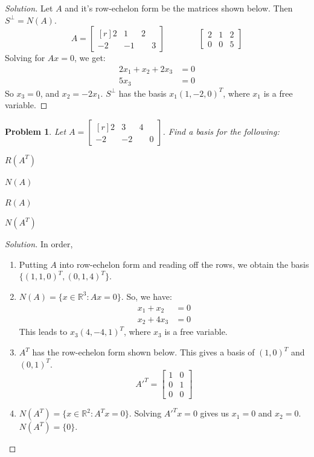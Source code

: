 \documentclass[oneside]{book}
\theoremstyle{mystyle}
\newtheorem{problem}{Problem}[section]
\begin{document}
\begin{proof}[Solution]
Let $A$ and it's row-echelon form be the matrices shown below. Then $S^{\perp} = N(A)$.
\begin{equation*}
    A=\begin{bmatrix*}[r] 2 & 1 & 2 \\ -2 & -1 & \phantom{-}3\end{bmatrix*}\quad\quad\quad\quad \begin{bmatrix} 2 & 1 & 2 \\ 0 & 0 & 5 \end{bmatrix}
\end{equation*}
Solving for $Ax = 0$, we get:
\begin{align*}
     2x_1 + x_2 + 2x_3 &= 0\\ 
     5x_3 &= 0    
\end{align*}
So $x_3 = 0$, and $x_2 = - 2x_1$. $S^{\perp}$ has the basis $x_1(1,-2,0)^T$, where $x_1$ is a free variable.
\end{proof}
\begin{problem}
Let $A = \begin{bmatrix*}[r] 2 & 3 & 4 \\ -2 & -2 & \phantom{-}0 \end{bmatrix*}$. Find a basis for the following:
\begin{enumerate}
\begin{multicols}{4}
    \item $R(A^T)$
    \item $N(A)$
    \item $R(A)$
    \item $N(A^T)$
\end{multicols}
\end{enumerate}
\end{problem}
\begin{proof}[Solution]
In order,
\begin{enumerate}[itemsep=0pt]
    \item Putting $A$ into row-echelon  form and reading off the rows, we obtain the basis $\{(1,1,0)^T,(0,1,4)^T\}$.
    \item $N(A) = \{x\in \mathbb{R}^3:  Ax = 0\}$. So, we have:
    \begin{align*}
        x_1 + x_2 &= 0\\
        x_2 + 4x_3 &= 0    
    \end{align*}
This leads to $x_3(4,-4,1)^T$, where $x_3$ is a free variable.
\item $A^{T}$ has the row-echelon form shown below. This gives a basis of $(1,0)^T$ and $(0,1)^T$.
    \begin{equation*}
        A'^{T}=\begin{bmatrix} 1 & 0 \\ 0 & 1 \\ 0 & 0 \end{bmatrix}
    \end{equation*}
\item $N(A^T) = \{x\in \mathbb{R}^2: A^Tx = 0\}$. Solving $A'^{T}x=0$ gives us $x_1 = 0$ and $x_2 = 0$. $N(A^T) = \{0\}$.
\end{enumerate}
\end{proof}
\end{document}
